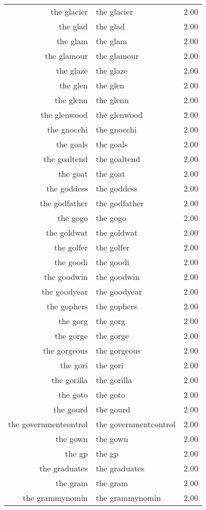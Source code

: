 \begin{table}[ht]
\begin{tabular}{rlr}
  the glacier & the glacier & 2.00 \\ 
  the glad & the glad & 2.00 \\ 
  the glam & the glam & 2.00 \\ 
  the glamour & the glamour & 2.00 \\ 
  the glaze & the glaze & 2.00 \\ 
  the glen & the glen & 2.00 \\ 
  the glenn & the glenn & 2.00 \\ 
  the glenwood & the glenwood & 2.00 \\ 
  the gnocchi & the gnocchi & 2.00 \\ 
  the goals & the goals & 2.00 \\ 
  the goaltend & the goaltend & 2.00 \\ 
  the goat & the goat & 2.00 \\ 
  the goddess & the goddess & 2.00 \\ 
  the godfather & the godfather & 2.00 \\ 
  the gogo & the gogo & 2.00 \\ 
  the goldwat & the goldwat & 2.00 \\ 
  the golfer & the golfer & 2.00 \\ 
  the goodi & the goodi & 2.00 \\ 
  the goodwin & the goodwin & 2.00 \\ 
  the goodyear & the goodyear & 2.00 \\ 
  the gophers & the gophers & 2.00 \\ 
  the gorg & the gorg & 2.00 \\ 
  the gorge & the gorge & 2.00 \\ 
  the gorgeous & the gorgeous & 2.00 \\ 
  the gori & the gori & 2.00 \\ 
  the gorilla & the gorilla & 2.00 \\ 
  the goto & the goto & 2.00 \\ 
  the gourd & the gourd & 2.00 \\ 
  the governmentcontrol & the governmentcontrol & 2.00 \\ 
  the gown & the gown & 2.00 \\ 
  the gp & the gp & 2.00 \\ 
  the graduates & the graduates & 2.00 \\ 
  the gram & the gram & 2.00 \\ 
  the grammynomin & the grammynomin & 2.00 \\ 

\end{tabular}
\end{table}
